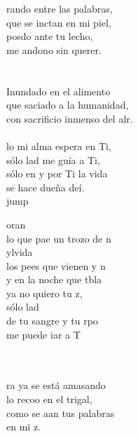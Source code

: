 \begin{cancion}%
	rando entre las palabras,\\
	que se inctan en mi piel,\\
	posdo ante tu lecho,\\
	me andono sin querer.\\
	\jump\\
	\jump\\
Inundado en el alimento\\
	que saciado a la humanidad,\\
	con sacrificio inmenso del alr.\\
	\jump\\
	lo mi alma espera en Ti,  \\
	sólo lad me guía a Ti, \\
	sólo en y por Ti la vida \\
	se hace dueña deí. \\jump\\
	\begin{chorus}%
	oran \\
	lo que pae un trozo de n\\
	ylvida \\
	los pees que vienen y n \\
	y en la noche que tbla \\
	ya no quiero tu z, \\
	sólo lad \\
	de tu sangre y tu rpo  \\
	me puede iar a T\\
	\end{chorus}%
	\jump\\
	\jump\\
	ra ya se está amasando \\
	lo recoo en el trigal, \\
	como se aan tus palabras \\
	en mi z. \\
	\jump\\

\end{cancion}
